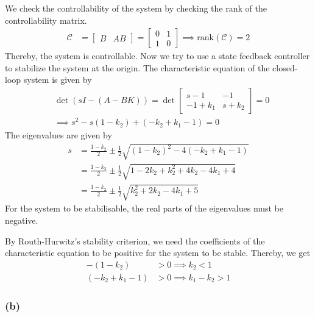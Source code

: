 We check the controllability of the system by checking the rank of the controllability matrix.
\begin{align*}
    \mathcal{C}
     & =
    \begin{bmatrix}
        B & AB
    \end{bmatrix}
    =
    \begin{bmatrix}
        0 & 1 \\
        1 & 0
    \end{bmatrix}
    \implies
    \text{rank}(\mathcal{C}) = 2
\end{align*}
Thereby, the system is controllable.
Now we try to use a state feedback controller to stabilize the system at the origin.
The characteristic equation of the closed-loop system is given by
\begin{align*}
     &
    \det(sI-(A-BK))
    =
    \det
    \begin{bmatrix}
        s-1      & -1      \\
        -1+k_{1} & s+k_{2}
    \end{bmatrix}
    =
    0
    \\ &
    \implies
    s^2 - s(1-k_2) + (-k_2 + k_1 - 1) = 0
\end{align*}
The eigenvalues are given by
\begin{align*}
    s
     & =
    \frac{1-k_2}{2} \pm \frac{1}{2} \sqrt{{(1-k_2)}^2 - 4(-k_2 + k_1 - 1)}
    \\ & =
    \frac{1-k_2}{2} \pm \frac{1}{2} \sqrt{1 - 2k_2 + k_2^2 + 4k_2 - 4k_1 + 4}
    \\ & =
    \frac{1-k_2}{2} \pm \frac{1}{2} \sqrt{k_2^2 + 2k_2 - 4k_1 + 5}
\end{align*}
For the system to be stabilisable, the real parts of the eigenvalues must be negative.

By Routh-Hurwitz's stability criterion, we need the coefficients of the characteristic equation to be positive for the system to be stable.
Thereby, we get
\begin{align*}
    -(1-k_2)         & > 0 \implies k_2 < 1
    \\
    (-k_2 + k_1 - 1) & > 0 \implies k_1 - k_2 > 1
\end{align*}

\subsubsection*{(b)}

